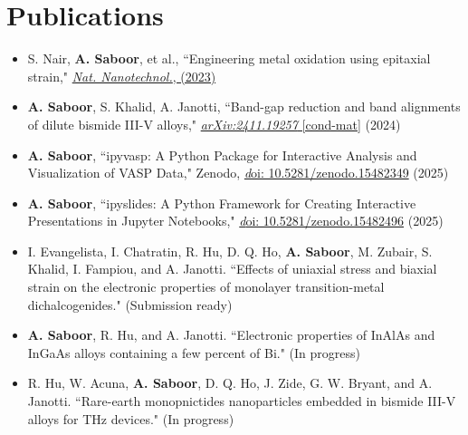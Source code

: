 \documentclass[letter,11pt]{article}
\begin{document}
\section{Publications}
\begin{itemize}
    \item S. Nair, \textbf{A. Saboor}, et al., ``Engineering metal oxidation using epitaxial strain," \href{https://www.nature.com/articles/s41565-023-01397-0}{\textit{Nat. Nanotechnol.}, (2023)}
    \item \textbf{A. Saboor}, S. Khalid, A. Janotti, ``Band-gap reduction and band alignments of dilute bismide III-V alloys," \href{https://arxiv.org/abs/2411.19257}{\textit{arXiv:2411.19257} [cond-mat]} (2024)
    \item \textbf{A. Saboor}, ``ipyvasp: A Python Package for Interactive Analysis and Visualization of VASP Data," Zenodo, \href{https://zenodo.org/records/15482349}{\textit doi: 10.5281/zenodo.15482349} (2025)
    \item \textbf{A. Saboor}, ``ipyslides: A Python Framework for Creating Interactive Presentations in Jupyter Notebooks," \href{https://zenodo.org/records/15482496}{\textit doi: 10.5281/zenodo.15482496} (2025)
    \item I. Evangelista, I. Chatratin, R. Hu, D. Q. Ho, \textbf{A. Saboor}, M. Zubair, S. Khalid, I. Fampiou, and A. Janotti. ``Effects of uniaxial stress and biaxial strain on the electronic properties of monolayer transition-metal dichalcogenides." (Submission ready)
    \item \textbf{A. Saboor}, R. Hu, and A. Janotti. ``Electronic properties of InAlAs and InGaAs alloys containing a few percent of Bi." (In progress)
    \item R. Hu, W. Acuna, \textbf{A. Saboor}, D. Q. Ho, J. Zide, G. W. Bryant, and A. Janotti. ``Rare-earth monopnictides nanoparticles embedded in bismide III-V alloys for THz devices." (In progress)
\end{itemize}
\end{document}
